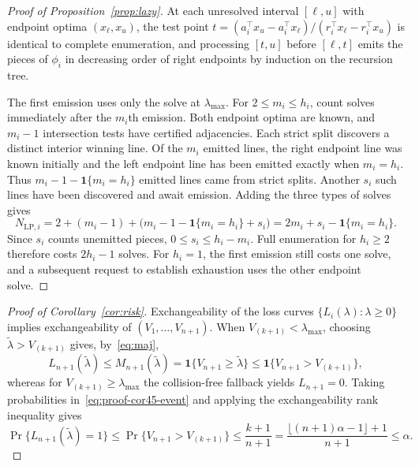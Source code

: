 \documentclass[a4paper,10pt]{article}
\theoremstyle{plain}
\theoremstyle{remark}
\begin{document}
\begin{proof}[Proof of Proposition~\ref{prop:lazy}]
At each unresolved interval $[\ell,u]$ with endpoint optima $(x_\ell,x_u)$, the test point $t=(a_i^\top x_u-a_i^\top x_\ell)/(r_i^\top x_\ell-r_i^\top x_u)$ is identical to complete enumeration, and processing $[t,u]$ before $[\ell,t]$ emits the pieces of $\phi_i$ in decreasing order of right endpoints by induction on the recursion tree.

The first emission uses only the solve at $\lambda_{\max}$. For $2\le m_i\le h_i$, count solves immediately after the $m_i$th emission. Both endpoint optima are known, and $m_i-1$ intersection tests have certified adjacencies. Each strict split discovers a distinct interior winning line. Of the $m_i$ emitted lines, the right endpoint line was known initially and the left endpoint line has been emitted exactly when $m_i=h_i$. Thus $m_i-1-\mathbf 1\{m_i=h_i\}$ emitted lines came from strict splits. Another $s_i$ such lines have been discovered and await emission. Adding the three types of solves gives
\begin{equation}\label{eq:proof-prop44-count}
 N_{\mathrm{LP},i}=2+(m_i-1)+\bigl(m_i-1-\mathbf 1\{m_i=h_i\}+s_i\bigr)
 =2m_i+s_i-\mathbf 1\{m_i=h_i\}.
\end{equation}
Since $s_i$ counts unemitted pieces, $0\le s_i\le h_i-m_i$. Full enumeration for $h_i\ge2$ therefore costs $2h_i-1$ solves. For $h_i=1$, the first emission still costs one solve, and a subsequent request to establish exhaustion uses the other endpoint solve.
\end{proof}

\begin{proof}[Proof of Corollary~\ref{cor:risk}]
Exchangeability of the loss curves $\{L_i(\lambda):\lambda\ge0\}$ implies exchangeability of $(V_1,\ldots,V_{n+1})$. When $V_{(k+1)}<\lambda_{\max}$, choosing $\widetilde\lambda>V_{(k+1)}$ gives, by~\eqref{eq:maj},
\begin{equation}\label{eq:proof-cor45-event}
 L_{n+1}(\widetilde\lambda)\le M_{n+1}(\widetilde\lambda)=\mathbf1\{V_{n+1}\ge\widetilde\lambda\}\le\mathbf1\{V_{n+1}>V_{(k+1)}\},
\end{equation}
whereas for $V_{(k+1)}\ge\lambda_{\max}$ the collision-free fallback yields $L_{n+1}=0$. Taking probabilities in~\eqref{eq:proof-cor45-event} and applying the exchangeability rank inequality gives
\begin{equation}\label{eq:proof-cor45-prob}
 \Pr\bigl\{L_{n+1}(\widetilde\lambda)=1\bigr\}
 \le\Pr\bigl\{V_{n+1}>V_{(k+1)}\bigr\}
 \le\frac{k+1}{n+1}
 =\frac{\lfloor(n+1)\alpha-1\rfloor+1}{n+1}
 \le\alpha.
\end{equation}
\end{proof}
\end{document}
